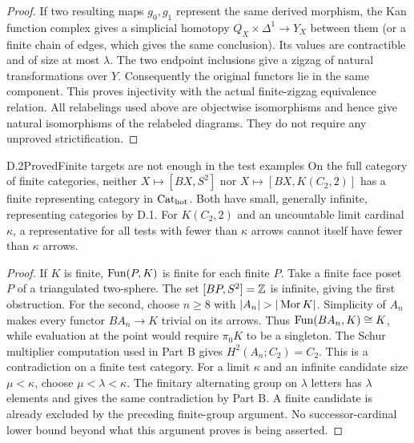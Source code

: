 \begin{proof}
If two resulting maps $g_0,g_1$ represent the same derived morphism, the Kan function complex gives a simplicial homotopy $Q_X\times\Delta^1\to Y_X$ between them (or a finite chain of edges, which gives the same conclusion). Its values are contractible and of size at most $\lambda$. The two endpoint inclusions give a zigzag of natural transformations over $Y$. Consequently the original functors lie in the same component. This proves injectivity with the actual finite-zigzag equivalence relation. All relabelings used above are objectwise isomorphisms and hence give natural isomorphisms of the relabeled diagrams. They do not require any unproved strictification.
\end{proof}

\begin{claim}{D.2}{Proved}{Finite targets are not enough in the test examples}
On the full category of finite categories, neither $X\mapsto[BX,S^2]$ nor $X\mapsto[BX,K(C_2,2)]$ has a finite representing category in ${\mathrm{Cat}_{\mathrm{hot}}}$. Both have small, generally infinite, representing categories by D.1. For $K(C_2,2)$ and an uncountable limit cardinal $\kappa$, a representative for all tests with fewer than $\kappa$ arrows cannot itself have fewer than $\kappa$ arrows.
\end{claim}
\begin{proof}
If $K$ is finite, $\operatorname{Fun}(P,K)$ is finite for each finite $P$. Take a finite face poset $P$ of a triangulated two-sphere. The set $[BP,S^2]=\mathbb Z$ is infinite, giving the first obstruction. For the second, choose $n\geq8$ with $|A_n|>|\Mor K|$. Simplicity of $A_n$ makes every functor $BA_n\to K$ trivial on its arrows. Thus $\operatorname{Fun}(BA_n,K)\cong K$, while evaluation at the point would require $\pi_0K$ to be a singleton. The Schur multiplier computation used in Part B gives $H^2(A_n;C_2)=C_2$. This is a contradiction on a finite test category. For a limit $\kappa$ and an infinite candidate size $\mu<\kappa$, choose $\mu<\lambda<\kappa$. The finitary alternating group on $\lambda$ letters has $\lambda$ elements and gives the same contradiction by Part B. A finite candidate is already excluded by the preceding finite-group argument. No successor-cardinal lower bound beyond what this argument proves is being asserted.
\end{proof}

